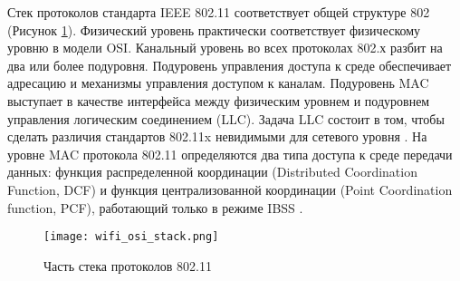 Стек протоколов стандарта IEEE 802.11 соответствует общей структуре 802 (Рисунок \cref{fig:part1_wifi_osi_stack}). Физический уровень практически соответствует физическому уровню в модели OSI. Канальный уровень во всех протоколах 802.х разбит на два или более подуровня.  Подуровень управления доступа к среде обеспечивает адресацию и механизмы управления доступом к каналам. Подуровень MAC выступает в качестве интерфейса между физическим уровнем и подуровнем управления логическим соединением (LLC). Задача LLC состоит в том, чтобы сделать различия стандартов 802.11x невидимыми для сетевого уровня \cite{Tanenbaum2022}. На уровне MAC протокола 802.11 определяются два типа доступа к среде передачи данных: функция распределенной координации (Distributed Coordination Function, DCF) и функция централизованной координации (Point Coordination function, PCF), работающий только в режиме IBSS \cite{802.11WG-WirelessLANWorkingGroup2020}.


\begin{figure}[h!]
  \centering
   \texttt{[image: wifi\_osi\_stack.png]}
\caption{Часть стека протоколов 802.11}
\label{fig:part1_wifi_osi_stack}
\end{figure}

